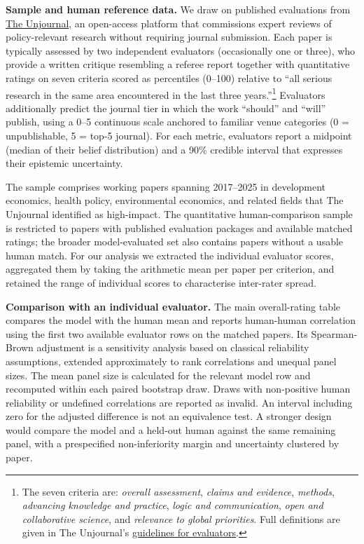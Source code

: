 \documentclass[
  11pt,
  letterpaper,
]{article}
\begin{document}
\textbf{Sample and human reference data.} We draw on published
evaluations from
\href{https://unjournal.github.io/unjournaldata/index.html}{The
Unjournal}, an open-access platform that commissions expert reviews of
policy-relevant research without requiring journal submission. Each
paper is typically assessed by two independent evaluators (occasionally
one or three), who provide a written critique resembling a referee
report together with quantitative ratings on seven criteria scored as
percentiles (0--100) relative to ``all serious research in the same area
encountered in the last three years.''\footnote{The seven criteria are:
  \emph{overall assessment}, \emph{claims and evidence}, \emph{methods},
  \emph{advancing knowledge and practice}, \emph{logic and
  communication}, \emph{open and collaborative science}, and
  \emph{relevance to global priorities}. Full definitions are given in
  The Unjournal's
  \href{https://globalimpact.gitbook.io/the-unjournal-project-and-communication-space/policies-projects-evaluation-workflow/evaluation/guidelines-for-evaluators}{guidelines
  for evaluators}.} Evaluators additionally predict the journal tier in
which the work ``should'' and ``will'' publish, using a 0--5 continuous
scale anchored to familiar venue categories (0 = unpublishable, 5 =
top-5 journal). For each metric, evaluators report a midpoint (median of
their belief distribution) and a 90\% credible interval that expresses
their epistemic uncertainty.

The sample comprises working papers spanning 2017--2025 in development
economics, health policy, environmental economics, and related fields
that The Unjournal identified as high-impact. The quantitative
human-comparison sample is restricted to papers with published
evaluation packages and available matched ratings; the broader
model-evaluated set also contains papers without a usable human match.
For our analysis we extracted the individual evaluator scores,
aggregated them by taking the arithmetic mean per paper per criterion,
and retained the range of individual scores to characterise inter-rater
spread.

\textbf{Comparison with an individual evaluator.} The main
overall-rating table compares the model with the human mean and reports
human-human correlation using the first two available evaluator rows on
the matched papers. Its Spearman-Brown adjustment is a sensitivity
analysis based on classical reliability assumptions, extended
approximately to rank correlations and unequal panel sizes. The mean
panel size is calculated for the relevant model row and recomputed
within each paired bootstrap draw. Draws with non-positive human
reliability or undefined correlations are reported as invalid. An
interval including zero for the adjusted difference is not an
equivalence test. A stronger design would compare the model and a
held-out human against the same remaining panel, with a prespecified
non-inferiority margin and uncertainty clustered by paper.
\end{document}
